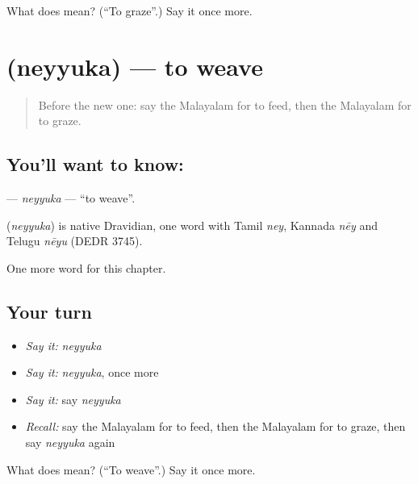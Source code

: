 \begin{tcolorbox}[breakable,colback=teal!4,colframe=teal!35!black,title={Before you move on}]
What does  mean? (\textquotedblleft{}To graze\textquotedblright{}.) Say it once more.
\end{tcolorbox}
\section[\texorpdfstring{\ml{നെയ്യുക} (neyyuka)}{നെയ്യുക (neyyuka)}]{ (neyyuka) — to weave}

\label{lesson:ML-C272-neyyuka}



\begin{quote}
Before the new one: say the Malayalam for to feed, then the Malayalam for to graze.
\end{quote}

\subsection*{You'll want to know: }
\textbf{} — \emph{neyyuka} — \textquotedblleft{}to weave\textquotedblright{}.

\begin{cousinweb}
\textbf{} (\emph{neyyuka}) is native Dravidian, one word with Tamil \emph{ney}, Kannada \emph{nēy} and Telugu \emph{nēyu} (DEDR 3745).
\end{cousinweb}

\begin{grammarlens}[title={What you've built}]
One more word for this chapter.
\end{grammarlens}

\subsection*{Your turn}
\begin{itemize}
\raggedright
  \item \emph{Say it:} \emph{neyyuka}
  \item \emph{Say it:} \emph{neyyuka}, once more
  \item \emph{Say it:} say \emph{neyyuka}
  \item \emph{Recall:} say the Malayalam for to feed, then the Malayalam for to graze, then say \emph{neyyuka} again
\end{itemize}

\begin{tcolorbox}[breakable,colback=teal!4,colframe=teal!35!black,title={Before you move on}]
What does  mean? (\textquotedblleft{}To weave\textquotedblright{}.) Say it once more.
\end{tcolorbox}
